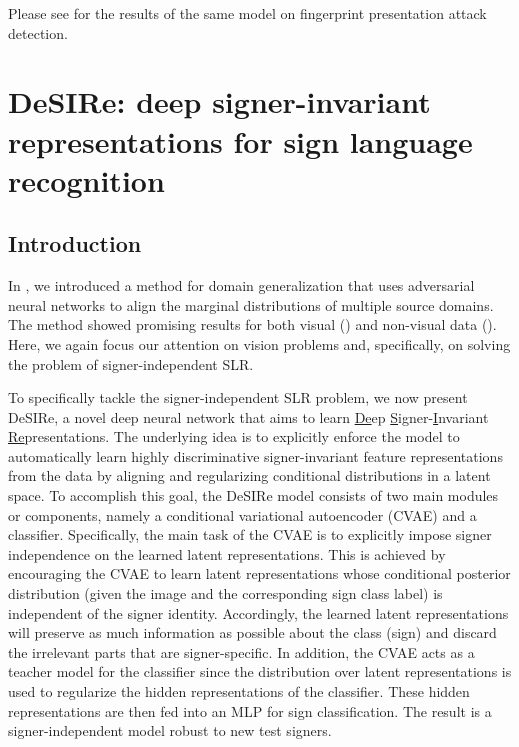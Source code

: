 Please see \citet{AdvInvAttack2} for the results of the same model on fingerprint presentation attack detection.

\section{DeSIRe: deep signer-invariant representations for sign language recognition}
\label{sec:desire}

\subsection{Introduction}
In , we introduced a method for domain generalization that uses adversarial neural networks to align the marginal distributions of multiple source domains. The method showed promising results for both visual () and non-visual data (). Here, we again focus our attention on vision problems and, specifically, on solving the problem of signer-independent SLR.

To specifically tackle the signer-independent SLR problem, we now present DeSIRe, a novel deep neural network that aims to learn \underline{De}ep \underline{S}igner-\underline{I}nvariant \underline{Re}presentations. The underlying idea is to explicitly enforce the model to automatically learn highly discriminative signer-invariant feature representations from the data by aligning and regularizing conditional distributions in a latent space. To accomplish this goal, the DeSIRe model consists of two main modules or components, namely a conditional variational autoencoder (CVAE) and a classifier. Specifically, the main task of the CVAE is to explicitly impose signer independence on the learned latent representations. This is achieved by encouraging the CVAE to learn latent representations whose conditional posterior distribution (given the image and the corresponding sign class label) is independent of the signer identity. Accordingly, the learned latent representations will preserve as much information as possible about the class (sign) and discard the irrelevant parts that are signer-specific. In addition, the CVAE acts as a teacher model for the classifier since the distribution over latent representations is used to regularize the hidden representations of the classifier. These hidden representations are then fed into an MLP for sign classification. The result is a signer-independent model robust to new test signers.

